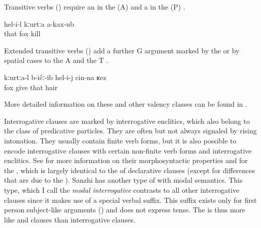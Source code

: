 Transitive verbs () require an  in the  (A) and a  in the  (P) . 
%
\begin{exe}
	\ex	\label{ex:He did not kill the fox}
	\gll	hel-i-l	kːurtːa a-kax-ub\\
		that	fox kill\\
	\glt	{}
\end{exe}

Extended transitive verbs () add a further G argument marked by the  or by spatial cases to the  A and the  T .
%
\begin{exe}
	\ex	\label{ex:The fox gave him his hair}
	\gll	kːurtːa-l	b-ičː-ib	hel-i-j	cin-na	ʁez\\
		fox	give	that		hair\\
	\glt	{}
\end{exe}

More detailed information on these and other valency classes can be found in .

Interrogative clauses are marked by interrogative enclitics, which also belong to the class of predicative particles. They are often but not always signaled by rising intonation. They usually contain finite verb forms, but it is also possible to encode interrogative clauses with certain non-finite verb forms and interrogative enclitics. See  for more information on their morphosyntactic properties and  for the , which is largely identical to the  of declarative clauses (except for differences that are due to the ). Sanzhi has another type of  with modal semantics. This type, which I call the \textit{modal interrogative} contrasts to all other interrogative clauses since it makes use of a special verbal suffix. This suffix exists only for first person subject-like arguments () and does not express tense. The  is thus more like  and  clauses than interrogative clauses. 

